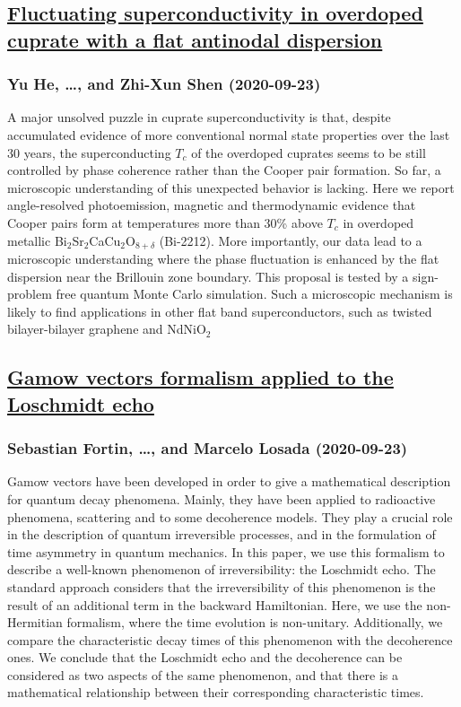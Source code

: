 {\subsection*{\href{http://arxiv.org/abs/2009.10932v1}{Fluctuating superconductivity in overdoped cuprate with a flat antinodal  dispersion}}
\subsubsection*{Yu He, \dots, and Zhi-Xun Shen (2020-09-23)}
A major unsolved puzzle in cuprate superconductivity is that, despite
accumulated evidence of more conventional normal state properties over the last
30 years, the superconducting $T_c$ of the overdoped cuprates seems to be still
controlled by phase coherence rather than the Cooper pair formation. So far, a
microscopic understanding of this unexpected behavior is lacking. Here we
report angle-resolved photoemission, magnetic and thermodynamic evidence that
Cooper pairs form at temperatures more than 30\% above $T_c$ in overdoped
metallic Bi$_2$Sr$_2$CaCu$_2$O$_{8+\delta}$ (Bi-2212). More importantly, our
data lead to a microscopic understanding where the phase fluctuation is
enhanced by the flat dispersion near the Brillouin zone boundary. This proposal
is tested by a sign-problem free quantum Monte Carlo simulation. Such a
microscopic mechanism is likely to find applications in other flat band
superconductors, such as twisted bilayer-bilayer graphene and NdNiO$_2$

\subsection*{\href{http://arxiv.org/abs/2009.10928v1}{Gamow vectors formalism applied to the Loschmidt echo}}
\subsubsection*{Sebastian Fortin, \dots, and Marcelo Losada (2020-09-23)}
Gamow vectors have been developed in order to give a mathematical description
for quantum decay phenomena. Mainly, they have been applied to radioactive
phenomena, scattering and to some decoherence models. They play a crucial role
in the description of quantum irreversible processes, and in the formulation of
time asymmetry in quantum mechanics. In this paper, we use this formalism to
describe a well-known phenomenon of irreversibility: the Loschmidt echo. The
standard approach considers that the irreversibility of this phenomenon is the
result of an additional term in the backward Hamiltonian. Here, we use the
non-Hermitian formalism, where the time evolution is non-unitary. Additionally,
we compare the characteristic decay times of this phenomenon with the
decoherence ones. We conclude that the Loschmidt echo and the decoherence can
be considered as two aspects of the same phenomenon, and that there is a
mathematical relationship between their corresponding characteristic times.

}
